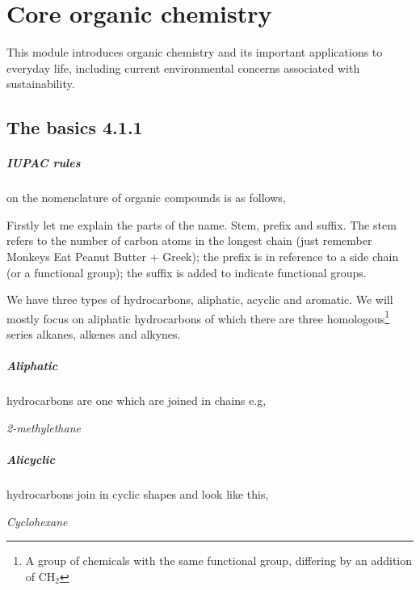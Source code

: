 
\chapter{Core organic chemistry}
This module introduces organic chemistry and its important applications to everyday life, including current environmental concerns associated with sustainability.

\section{The basics 4.1.1}

	\paragraph{IUPAC rules} on the nomenclature of organic compounds is as follows,
		
	Firstly let me explain the parts of the name.
	Stem, prefix and suffix. The stem refers to the number of carbon atoms in the longest chain (just remember Monkeys Eat Peanut Butter + Greek); the prefix is in reference to a side chain (or a functional group); the suffix is added to indicate functional groups.
	
	We have three types of hydrocarbons, aliphatic, acyclic and aromatic.
	We will mostly focus on aliphatic hydrocarbons of which there are three homologous\footnote{A group of chemicals with the same functional group, differing by an addition of CH$_2$} series alkanes, alkenes and alkynes.
	
	\paragraph{Aliphatic} hydrocarbons are one which are joined in chains e.g,
	\begin{center}
		
		\textit{2-methylethane}
	\end{center}
	
	\begin{samepage}
	\paragraph{Alicyclic} hydrocarbons join in cyclic shapes and look like this,
	\begin{center}
		
		\textit{Cyclohexane}
	\end{center}
	\end{samepage}
	
